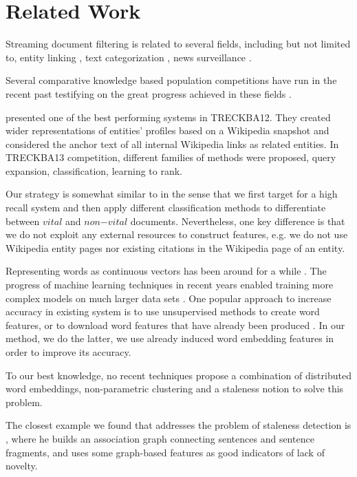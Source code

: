 \documentclass{article}
\begin{document}
{{\section{Related Work}
\label{related}

Streaming document filtering is related to several fields, including but not limited to, entity linking \cite{KBP11}, text categorization \cite{HLTCOE12}, news surveillance \cite{Steinberger14}.

Several comparative knowledge based population competitions have run in the recent past testifying on the great progress achieved in these fields \cite{gross_doucet_toivonen_trec12}. 

\citet{xitong12} presented one of the best performing systems in TRECKBA12. They created wider representations of entities' profiles based on a Wikipedia snapshot and considered the anchor text of all internal Wikipedia links as related entities. In TRECKBA13 competition, different families of methods were proposed, query expansion, classification, learning to rank. 

Our strategy is somewhat similar to \citet{jingang13} in the sense that we first target for a high recall system and then apply different classification methods to differentiate between $vital$ and $non\mathord{-}vital$ documents. Nevertheless, one key difference is that we do not exploit any external resources to construct features, e.g. we do not use Wikipedia entity pages nor existing citations in the Wikipedia page of an entity. 

Representing words as continuous vectors has been around for a while \cite{Hinton87, Elman90findingstructure}. The progress of machine learning techniques in recent years enabled training more complex models on much larger data sets \cite{mikolovChen}. One popular approach to increase accuracy in existing system is to use unsupervised methods to create word features, or to download word features that have already been produced \cite{Turian10wordrepresentations}. In our method, we do the latter, we use already induced word embedding features in order to improve its accuracy.

To our best knowledge, no recent techniques propose a combination of distributed word embeddings, non-parametric clustering and a staleness notion to solve this problem. 

The closest example we found that addresses the problem of staleness detection is \cite{gamon}, where he builds an association graph connecting sentences and sentence fragments, and uses some graph-based features as good indicators of lack of novelty.

}}
\end{document}
